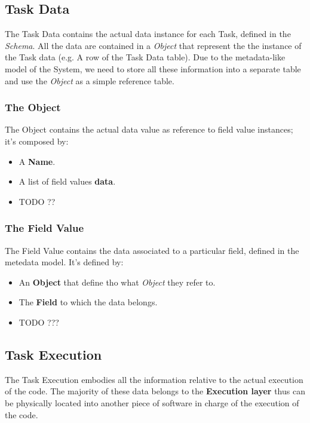 \subsection{Task Data}
The Task Data contains the actual data instance for each Task, defined in the
\emph{Schema}. All the data are contained in a \emph{Object} that represent the
the instance of the Task data (e.g. A row of the Task Data table). Due to the
metadata-like model of the System, we need to store all these information into
a separate table and use the \emph{Object} as a simple reference table.

\subsubsection{The Object}
The Object contains the actual data value as reference to field value instances;
it's composed by:
\begin{itemize}
    \item A \textbf{Name}.
    \item A list of field values \textbf{data}.
    \item TODO ??
\end{itemize}


\subsubsection{The Field Value}
The Field Value contains the data associated to a particular field, defined in
the metedata model. It's defined by:
\begin{itemize}
    \item An \textbf{Object} that define tho what \emph{Object} they refer to.
    \item The \textbf{Field} to which the data belongs.
    \item TODO ???
\end{itemize}







\subsection{Task Execution}
The Task Execution embodies all the information relative to the actual execution
of the code. The majority of these data belongs to the \textbf{Execution layer}
thus can be physically located into another piece of software in charge of the
execution of the code.


